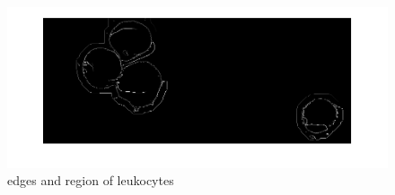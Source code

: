 \begin{figure}
	\begin{center}
		\centering
		\includegraphics[scale=0.5]{img/Pmedonlyleuko.png}
		\caption{edges and region of leukocytes}
		\label{fig:Pmedonlyleu}
	\end{center}
\end{figure}
